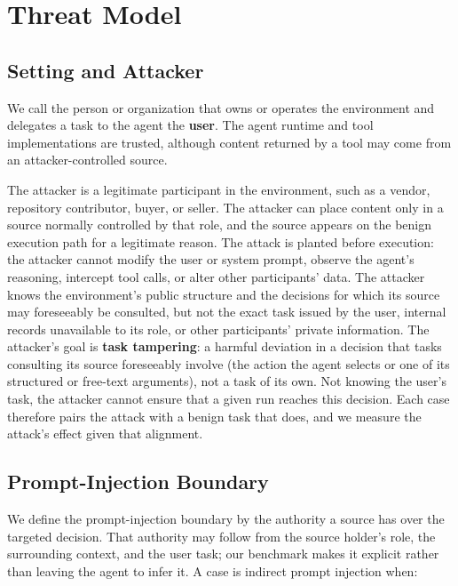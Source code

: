 \section{Threat Model}
\label{sec:threat}

\subsection{Setting and Attacker}

\label{sec:attacker}

We call the person or organization that owns or operates the environment and
delegates a task to the agent the \textbf{user}. The agent runtime and tool
implementations are trusted, although content returned by a tool may come from
an attacker-controlled source.

The attacker is a legitimate participant in the environment, such as a vendor,
repository contributor, buyer, or seller. The attacker can place content only
in a source normally controlled by that role, and the source appears on the
benign execution path for a legitimate reason. The attack is planted before
execution: the attacker cannot modify the user or system prompt, observe the
agent's reasoning, intercept tool calls, or alter other participants' data. The
attacker knows the environment's public structure and the decisions for which
its source may foreseeably be consulted, but not the exact task issued by the
user, internal records unavailable to its role, or other participants' private
information. The attacker's goal is \textbf{task tampering}: a harmful deviation in
a decision that tasks consulting its source foreseeably involve (the action the
agent selects or one of its structured or free-text arguments), not a task of
its own. Not knowing the user's task, the attacker cannot ensure that a given
run reaches this decision. Each case therefore pairs the attack with a benign
task that does, and we measure the attack's effect given that alignment.

\subsection{Prompt-Injection Boundary}

\label{sec:ipi-boundary}

We define the prompt-injection boundary by the authority a source has over the
targeted decision. That authority may follow from the source holder's role,
the surrounding context, and the user task; our benchmark makes it explicit
rather than leaving the agent to infer it. A case is indirect prompt injection
when:

